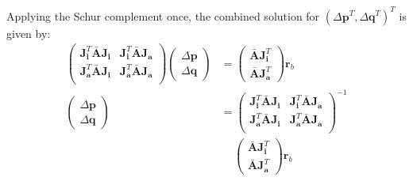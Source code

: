 Applying the Schur complement once, the combined solution for $(\Delta\mathbf{p}^T, \Delta\mathbf{q}^T)^T$ is given by:
\begin{equation}
    \begin{aligned}
        \begin{pmatrix}
            \mathbf{J}_{\mathbf{i}}^T \bar{\mathbf{A}}\mathbf{J}_{\mathbf{i}} & \mathbf{J}_{\mathbf{i}}^T \bar{\mathbf{A}}\mathbf{J}_{\mathbf{a}}
            \\ 
            \mathbf{J}_{\mathbf{a}}^T \bar{\mathbf{A}}\mathbf{J}_{\mathbf{i}} & \mathbf{J}_{\mathbf{a}}^T \bar{\mathbf{A}}\mathbf{J}_{\mathbf{a}}
            \\
        \end{pmatrix}
        \begin{pmatrix}
            \Delta\mathbf{p}
            \\
            \Delta\mathbf{q}
        \end{pmatrix} & = 
        \begin{pmatrix}
            \bar{\mathbf{A}}\mathbf{J}_{\mathbf{i}}^T
            \\
            \bar{\mathbf{A}}\mathbf{J}_{\mathbf{a}}^T
        \end{pmatrix} \mathbf{r}_b
       \\
       \begin{pmatrix}
            \Delta\mathbf{p}
            \\
            \Delta\mathbf{q}
        \end{pmatrix} & = 
        \begin{pmatrix}
            \mathbf{J}_{\mathbf{i}}^T \bar{\mathbf{A}}\mathbf{J}_{\mathbf{i}} & \mathbf{J}_{\mathbf{i}}^T \bar{\mathbf{A}}\mathbf{J}_{\mathbf{a}}
            \\ 
            \mathbf{J}_{\mathbf{a}}^T \bar{\mathbf{A}}\mathbf{J}_{\mathbf{i}} & \mathbf{J}_{\mathbf{a}}^T \bar{\mathbf{A}}\mathbf{J}_{\mathbf{a}}
            \\
        \end{pmatrix}^{-1}
        \\
        & \quad \,
        \begin{pmatrix}
            \bar{\mathbf{A}}\mathbf{J}_{\mathbf{i}}^T
            \\
            \bar{\mathbf{A}}\mathbf{J}_{\mathbf{a}}^T
        \end{pmatrix} \mathbf{r}_b
    \label{eq:bidirectional_schur_solution1}
    \end{aligned}
\end{equation}
